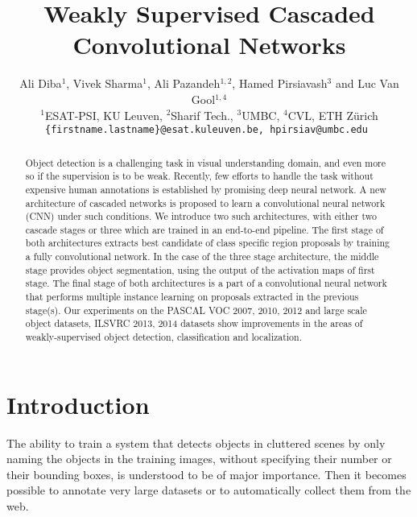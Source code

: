 \documentclass[10pt,twocolumn,letterpaper]{article}
\begin{document}
\title{Weakly Supervised Cascaded Convolutional Networks}

\author{
    {  Ali Diba$^{1}$,  Vivek Sharma$^{1}$, Ali Pazandeh$^{1,2}$, Hamed Pirsiavash$^{3}$ and Luc Van Gool$^{1,4}$}\\
    {\normalsize {$^{1}$ESAT-PSI, KU Leuven, $^{2}$Sharif Tech., $^{3}$UMBC, $^{4}$CVL, ETH Z\"{u}rich}} \\ 
     \tt\small \{firstname.lastname\}@esat.kuleuven.be, hpirsiav@umbc.edu
 }



\maketitle


\begin{abstract}
Object detection is a challenging task in visual understanding domain, and even more so if the supervision is to be weak. Recently, few efforts to handle the task without expensive human annotations is established by promising deep neural network. A new architecture of cascaded networks is proposed to learn a convolutional neural network (CNN) under such conditions. We introduce two such architectures, with either two cascade stages or three which are trained in an end-to-end pipeline. The first stage of both architectures extracts best candidate of class specific region proposals by training a fully convolutional network. In the case of the three stage architecture, the middle stage provides object segmentation, using the output of the activation maps of first stage. The final stage of both architectures is a part of a convolutional neural network that performs multiple instance learning on proposals extracted in the previous stage(s). Our experiments on the PASCAL VOC 2007, 2010, 2012 and large scale object datasets, ILSVRC 2013, 2014 datasets show improvements in the areas of weakly-supervised object detection, classification and localization.  

\end{abstract}

\section{Introduction}
The ability to train a system that detects objects in cluttered scenes by only naming the objects in the training images, without specifying their number or their bounding boxes, is understood to be of major importance. Then it becomes possible to annotate very large datasets or to automatically collect them from the web. 
\end{document}
